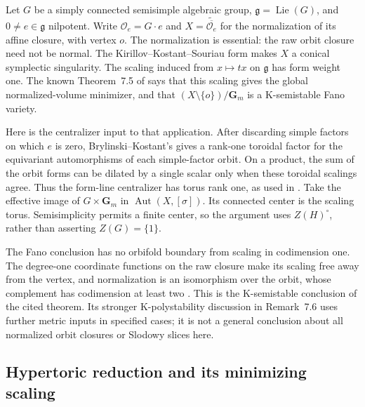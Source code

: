 Let $G$ be a simply connected semisimple algebraic group,
$\mathfrak g=\operatorname{Lie}(G)$, and $0\ne e\in\mathfrak g$
nilpotent. Write $\mathcal O_e=G\cdot e$ and
$X=\widetilde{\overline{\mathcal O_e}}$ for the normalization of
its affine closure, with vertex $o$. The normalization is essential:
the raw orbit closure need not be normal. The Kirillov--Kostant--Souriau
form makes $X$ a conical symplectic singularity. The scaling induced
from $x\mapsto t x$ on $\mathfrak g$ has form weight one.
The known Theorem~7.5 of \cite{XuZhuang26StableFormsV2} says that
this scaling gives the global normalized-volume minimizer, and that
$(X\setminus\{o\})/\mathbf G_m$ is a K-semistable Fano variety.

Here is the centralizer input to that application. After discarding
simple factors on which $e$ is zero, Brylinski--Kostant's
\cite[Theorem~7.1]{BrylinskiKostant94NilpotentPublished}
gives a rank-one toroidal factor for the equivariant automorphisms
of each simple-factor orbit. On a product, the sum of the orbit
forms can be dilated by a single scalar only when these toroidal
scalings agree. Thus the form-line centralizer has torus rank one,
as used in \cite[Lemma~7.4]{XuZhuang26StableFormsV2}.
Take the effective image of $G\times\mathbf G_m$ in
$\operatorname{Aut}(X,[\sigma])$. Its connected center is the
scaling torus. Semisimplicity permits a finite center, so the
argument uses $Z(H)^\circ$, rather than asserting $Z(G)=\{1\}$.

The Fano conclusion has no orbifold boundary from scaling in
codimension one. The degree-one coordinate functions on the raw
closure make its scaling free away from the vertex, and normalization
is an isomorphism over the orbit, whose complement has codimension
at least two \cite[Proposition~1.2]{BrylinskiKostant94NilpotentPublished}.
This is the K-semistable conclusion of the cited theorem.
Its stronger K-polystability discussion in Remark~7.6 uses further
metric inputs in specified cases; it is not a general conclusion
about all normalized orbit closures or Slodowy slices here.

\subsection{Hypertoric reduction and its minimizing scaling}
\label{sec:ytd-local-hypertoric-minimizer}

